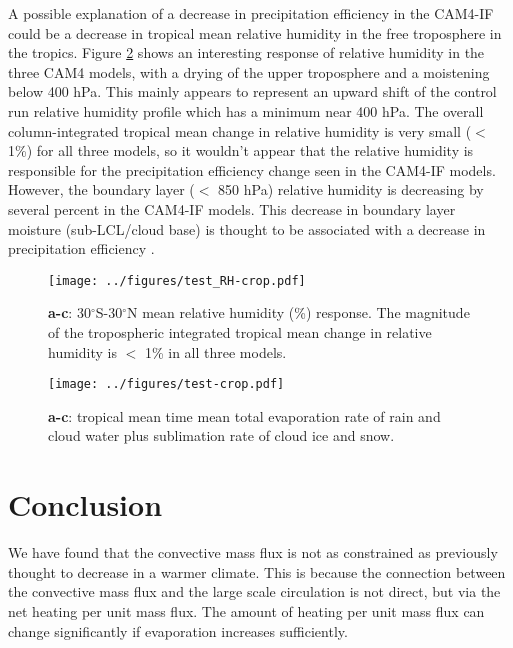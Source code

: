 \documentclass[letterpaper,12pt,titlepage,oneside,final]{book}
\begin{document}
A possible explanation of a decrease in precipitation efficiency in the CAM4-IF could be a decrease in tropical mean relative humidity in the free troposphere in the tropics. Figure \ref{fig:RH} shows an interesting response of relative humidity in the three CAM4 models, with a drying of the upper troposphere and a moistening below 400 hPa. This mainly appears to represent an upward shift of the control run relative humidity profile which has a minimum near 400 hPa. The overall column-integrated tropical mean change in relative humidity is very small ($<$ 1\%) for all three models, so it wouldn't appear that the relative humidity is responsible for the precipitation efficiency change seen in the CAM4-IF models. However, the boundary layer ($<$ 850 hPa) relative humidity is decreasing by several percent in the CAM4-IF models. This decrease in boundary layer moisture (sub-LCL/cloud base) is thought to be associated with a decrease in precipitation efficiency \citep{market_precipitation_2003,sherwood_spread_2014}. 
\begin{figure}[H]
\centering
\noindent\texttt{[image: ../figures/test\_RH-crop.pdf]}\hfill
\caption{\textbf{a-c}: 30$^{\circ}$S-30$^{\circ}$N mean relative humidity (\%) response. The magnitude of the tropospheric integrated tropical mean change in relative humidity is $<$ 1\% in all three models. }
\label{fig:RH}
\end{figure}
\begin{figure}[H]
\centering
\noindent\texttt{[image: ../figures/test-crop.pdf]}\hfill
\caption{\textbf{a-c}: tropical mean time mean total evaporation rate of rain and cloud water plus sublimation rate of cloud ice and snow. }
\label{fig:RH}
\end{figure}

\chapter{Conclusion}

We have found that the convective mass flux is not as constrained as previously thought to decrease in a warmer climate. This is because the connection between the convective mass flux and the large scale circulation is not direct, but via the net heating per unit mass flux. The amount of heating per unit mass flux can change significantly if evaporation increases sufficiently.

\end{document}
